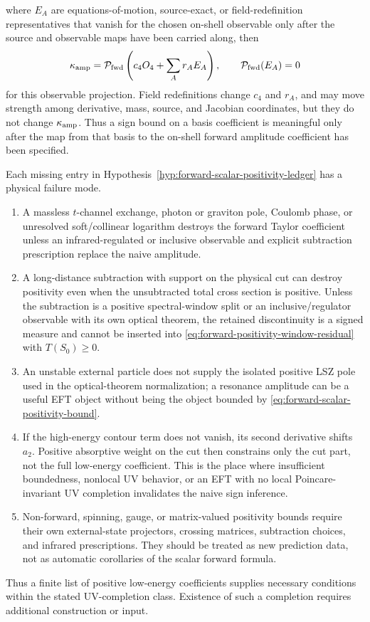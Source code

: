 where \(E_A\) are equations-of-motion, source-exact, or field-redefinition
representatives that vanish for the chosen on-shell observable only after the
source and observable maps have been carried along, then
\[
  \kappa_{\rm amp}
  =
  \mathcal P_{\rm fwd}
  \left(c_4O_4+\sum_A r_AE_A\right),
  \qquad
  \mathcal P_{\rm fwd}(E_A)=0
\]
for this observable projection.  Field redefinitions change \(c_4\) and
\(r_A\), and may move strength among derivative, mass, source, and Jacobian
coordinates, but they do not change \(\kappa_{\rm amp}\).  Thus a sign bound on
a basis coefficient is meaningful only after the map from that basis to the
on-shell forward amplitude coefficient has been specified.

\begin{remark}
\label{rem:eft-positivity-failure-modes}
Each missing entry in
Hypothesis~\ref{hyp:forward-scalar-positivity-ledger} has a physical failure
mode.
\begin{enumerate}
  \item A massless \(t\)-channel exchange, photon or graviton pole, Coulomb
  phase, or unresolved soft/collinear logarithm destroys the forward Taylor
  coefficient unless an infrared-regulated or inclusive observable and explicit
  subtraction prescription replace the naive amplitude.
  \item A long-distance subtraction with support on the physical cut can destroy
  positivity even when the unsubtracted total cross section is positive.  Unless
  the subtraction is a positive spectral-window split or an inclusive/regulator
  observable with its own optical theorem, the retained discontinuity is a
  signed measure and cannot be inserted into
  \eqref{eq:forward-positivity-window-residual} with \(T(S_0)\ge0\).
  \item An unstable external particle does not supply the isolated positive LSZ
  pole used in the optical-theorem normalization; a resonance amplitude can be a
  useful EFT object without being the object bounded by
  \eqref{eq:forward-scalar-positivity-bound}.
  \item If the high-energy contour term does not vanish, its second derivative
  shifts \(a_2\).  Positive absorptive weight on the cut then constrains only
  the cut part, not the full low-energy coefficient.  This is the place where
  insufficient boundedness, nonlocal UV behavior, or an EFT with no local
  Poincare-invariant UV completion invalidates the naive sign inference.
  \item Non-forward, spinning, gauge, or matrix-valued positivity bounds require
  their own external-state projectors, crossing matrices, subtraction choices,
  and infrared prescriptions.  They should be treated as new prediction data,
  not as automatic corollaries of the scalar forward formula.
\end{enumerate}
Thus a finite list of positive low-energy coefficients supplies necessary
conditions within the stated UV-completion class.  Existence of such a
completion requires additional construction or input.
\end{remark}

